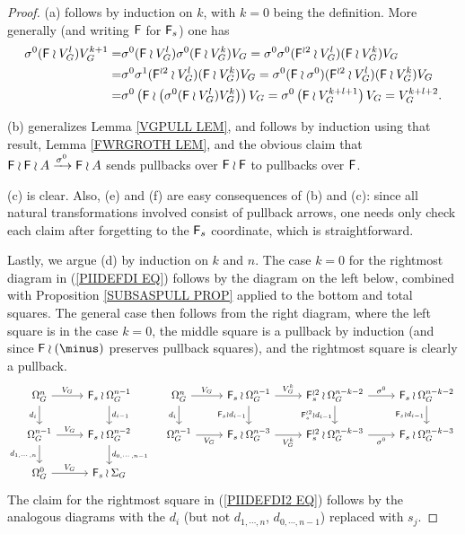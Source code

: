 \documentclass[a4paper,10pt]{article}%
\begin{document}
\begin{proof}
(a) follows by induction on $k$, with $k=0$ being the definition. More generally (and writing $\mathsf{F}$ for $\mathsf{F}_s$)
one has
\begin{align*}
	\sigma^0(\mathsf{F} \wr V_G^l)V_G^{k+1}= &
	\sigma^0(\mathsf{F} \wr V_G^l)\sigma^0 (\mathsf{F} \wr V_G^k) V_G =
	\sigma^0 \sigma^0 (\mathsf{F}^{\wr 2} \wr V_G^l)(\mathsf{F} \wr V_G^k) V_G
\\
	= & \sigma^0 \sigma^1 (\mathsf{F}^{\wr 2} \wr V_G^l)(\mathsf{F} \wr V_G^k) V_G =
	\sigma^0 (\mathsf{F} \wr \sigma^0)  (\mathsf{F}^{\wr 2} \wr V_G^l)(\mathsf{F} \wr V_G^k) V_G 
\\
	= & \sigma^0 \left(\mathsf{F} \wr \left( \sigma^0 (\mathsf{F} \wr V_G^l) V_G^k \right)\right) V_G = \sigma^0 \left(\mathsf{F} \wr V_G^{k+l+1}\right) V_G =
V_G^{k+l+2}.
\end{align*}

(b) generalizes Lemma \ref{VGPULL LEM}, and follows by induction using that result, Lemma \ref{FWRGROTH LEM},
and the obvious claim that $\mathsf{F} \wr \mathsf{F} \wr A \xrightarrow{\sigma^0} \mathsf{F} \wr A$ sends pullbacks over $\mathsf{F} \wr \mathsf{F}$ to pullbacks over $\mathsf{F}$.

(c) is clear. Also, (e) and (f) are easy consequences of (b) and (c): since all natural transformations involved consist of pullback arrows, one needs only check each claim after forgetting to the $\mathsf{F}_s$ coordinate, which is straightforward.

Lastly, we argue (d) by induction on $k$ and $n$. The case $k=0$ for the rightmost diagram in (\ref{PIIDEFDI EQ}) follows by the diagram on the left below, combined with
Proposition \ref{SUBSASPULL PROP} applied to the bottom and total squares. The general case then follows from the right diagram, 
where the left square is in the case $k=0$,
the middle square is a pullback by induction 
(and since $\Fin \wr (\minus)$ preserves pullback squares),
and the rightmost square is clearly a pullback.
\begin{equation}\label{PROOFD EQ}
\begin{tikzcd}[row sep=1.7em,column sep = 2.5em]
	\Omega_{G}^{n} \ar{d}[swap]{d_{i}} \ar{r}{V_G} &
	\Fin_s \wr \Omega_{G}^{n-1}
	\ar{d}{d_{i-1}} &
	\Omega_G^n \ar{r}{V_G} \ar{d}[swap]{d_i} &
	\Fin_s \wr \Omega_G^{n-1} \ar{r}{V_G^k} \ar{d}[swap]{\Fin_s \wr d_{i-1}} &
	\Fin_s^{\wr 2} \wr \Omega_G^{n-k-2} \ar{r}{\sigma^0} \ar{d}[swap]{\Fin_s^{\wr 2} \wr d_{i-1}}  &
	\Fin_s \wr \Omega_G^{n-k-2} \ar{d}[swap]{\Fin_s \wr d_{i-1}}
\\
	\Omega_{G}^{n-1} \ar{d}[swap]{d_{1,\cdots,n}} \ar{r}{V_G} &
	\Fin_s \wr \Omega_{G}^{n-2}
	\ar{d}{d_{0,\cdots,n-1}}  &
	\Omega_G^{n-1} \ar{r}[swap]{V_G} &
	\Fin_s \wr \Omega_G^{n-3} \ar{r}[swap]{V_G^k} &
	\Fin_s^{\wr 2} \wr \Omega_G^{n-k-3} \ar{r}[swap]{\sigma^0} &
	\Fin_s \wr \Omega_G^{n-k-3}
\\
	\Omega_{G}^{0} \ar{r}{V_G}&
	\Fin_s \wr \Sigma_G 
\end{tikzcd}
\end{equation}
The claim for the rightmost square in (\ref{PIIDEFDI2 EQ}) follows by the analogous diagrams with the $d_i$ (but not $d_{1,\cdots,n}$, 
$d_{0,\cdots,n-1}$) replaced with $s_j$.
\end{proof}
\end{document}
